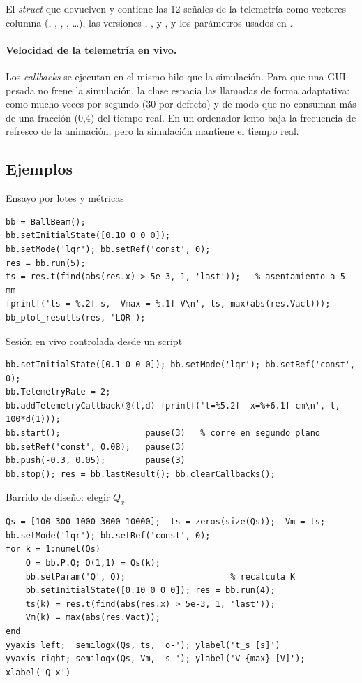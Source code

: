 El \emph{struct} que devuelven  y  contiene las 12 señales de la telemetría como vectores columna (, , , , \ldots), las versiones , ,  y , y los parámetros usados en .

\paragraph{Velocidad de la telemetría en vivo.} Los \emph{callbacks} se ejecutan en el mismo hilo que la simulación. Para que una GUI pesada no frene la simulación, la clase espacia las llamadas de forma adaptativa: como mucho  veces por segundo (30 por defecto) y de modo que no consuman más de una fracción  (0,4) del tiempo real. En un ordenador lento baja la frecuencia de refresco de la animación, pero la simulación mantiene el tiempo real.

\subsection{Ejemplos}

\begin{ejemplo}{Ensayo por lotes y métricas}
\begin{lstlisting}
bb = BallBeam();
bb.setInitialState([0.10 0 0 0]);
bb.setMode('lqr'); bb.setRef('const', 0);
res = bb.run(5);
ts = res.t(find(abs(res.x) > 5e-3, 1, 'last'));   % asentamiento a 5 mm
fprintf('ts = %.2f s,  Vmax = %.1f V\n', ts, max(abs(res.Vact)));
bb_plot_results(res, 'LQR');
\end{lstlisting}
\end{ejemplo}

\begin{ejemplo}{Sesión en vivo controlada desde un script}
\begin{lstlisting}
bb.setInitialState([0.1 0 0 0]); bb.setMode('lqr'); bb.setRef('const', 0);
bb.TelemetryRate = 2;
bb.addTelemetryCallback(@(t,d) fprintf('t=%5.2f  x=%+6.1f cm\n', t, 100*d(1)));
bb.start();                 pause(3)   % corre en segundo plano
bb.setRef('const', 0.08);   pause(3)
bb.push(-0.3, 0.05);        pause(3)
bb.stop(); res = bb.lastResult(); bb.clearCallbacks();
\end{lstlisting}
\end{ejemplo}

\begin{ejemplo}{Barrido de diseño: elegir $Q_x$}
\begin{lstlisting}
Qs = [100 300 1000 3000 10000];  ts = zeros(size(Qs));  Vm = ts;
bb.setMode('lqr'); bb.setRef('const', 0);
for k = 1:numel(Qs)
    Q = bb.P.Q; Q(1,1) = Qs(k);
    bb.setParam('Q', Q);                     % recalcula K
    bb.setInitialState([0.10 0 0 0]); res = bb.run(4);
    ts(k) = res.t(find(abs(res.x) > 5e-3, 1, 'last'));
    Vm(k) = max(abs(res.Vact));
end
yyaxis left;  semilogx(Qs, ts, 'o-'); ylabel('t_s [s]')
yyaxis right; semilogx(Qs, Vm, 's-'); ylabel('V_{max} [V]'); xlabel('Q_x')
\end{lstlisting}
\end{ejemplo}

